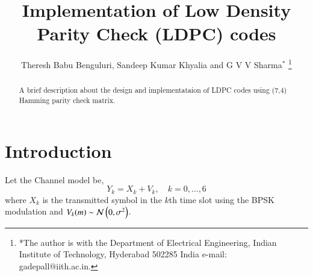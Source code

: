 \documentclass[journal,12pt,twocolumn]{IEEEtran}
\renewcommand\thesection{\arabic{section}}
\begin{document}
\let\StandardTheFigure\thefigure




\let\StandardTheFigure\thefigure
\let\StandardTheTable\thetable





\def\putbox#1#2#3{\makebox[0in][l]{\makebox[#1][l]{}\raisebox{\baselineskip}[0in][0in]{\raisebox{#2}[0in][0in]{#3}}}}
     \def\rightbox#1{\makebox[0in][r]{#1}}
     \def\centbox#1{\makebox[0in]{#1}}
     \def\topbox#1{\raisebox{-\baselineskip}[0in][0in]{#1}}
     \def\midbox#1{\raisebox{-0.5\baselineskip}[0in][0in]{#1}}




\title{ 
Implementation of Low Density Parity Check (LDPC) codes
}



\author{Theresh Babu Benguluri, Sandeep Kumar Khyalia and G V V Sharma$^{*}$%
\thanks{*The author is with the Department
of Electrical Engineering, Indian Institute of Technology, Hyderabad
502285 India e-mail:  gadepall@iith.ac.in.}
}


\maketitle

\tableofcontents

%
\begin{abstract}
\boldmath
A brief description about the design and implementataion of LDPC codes using (7,4) Hamming parity check matrix.
\end{abstract}



\section{Introduction}
Let the Channel model be,
\begin{equation}
Y_k= X_k + V_k, \quad k = 0,\dots,6
\end{equation} 
where $X_k$ is the  transmitted symbol in the $k$th time slot using the BPSK modulation and $V_k(m) \sim \mathcal{N}\left(0,\sigma^2\right) $. 
\end{document}
